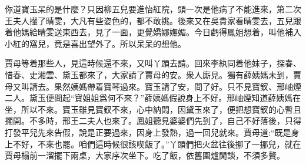 \begin{parag}
    你道寶玉呆的是什麼？只因柳五兒要進怡紅院，頭一次是他病了不能進來，第二次王夫人攆了晴雯，大凡有些姿色的，都不敢挑。後來又在吳貴家看晴雯去，五兒跟着他媽給晴雯送東西去，見了一面，更覺嬌娜嫵媚。今日虧得鳳姐想着，叫他補入小紅的窩兒，竟是喜出望外了。所以呆呆的想他。
\end{parag}


\begin{parag}
    賈母等着那些人，見這時候還不來，又叫丫頭去請。回來李紈同着他妹子，探春、惜春、史湘雲、黛玉都來了，大家請了賈母的安。衆人廝見。獨有薛姨媽未到，賈母又叫請去。果然姨媽帶着寶琴過來。寶玉請了安，問了好。只不見寶釵、邢岫煙二人。黛玉便問起“寶姐姐爲何不來？”薛姨媽假說身上不好。邢岫煙知道薛姨媽在坐，所以不來。寶玉雖見寶釵不來，心中納悶，因黛玉來了，便把想寶釵的心暫且擱開。不多時，邢王二夫人也來了。鳳姐聽見婆婆們先到了，自己不好落後，只得打發平兒先來告假，說是正要過來，因身上發熱，過一回兒就來。賈母道:“既是身上不好，不來也罷。咱們這時候很該喫飯了。”丫頭們把火盆往後挪了一挪兒，就在賈母榻前一溜擺下兩桌，大家序次坐下。吃了飯，依舊圍爐閒談，不須多贅。
\end{parag}


